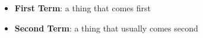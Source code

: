 \begin{itemize}[leftmargin=*]
    \item
        \textbf{First Term}:
        a thing that comes first
    \item
        \textbf{Second Term}:
        a thing that usually comes second
\end{itemize}
